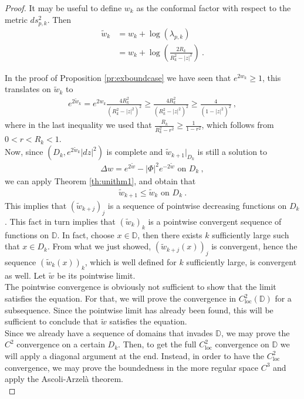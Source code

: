 \documentclass[a4paper,11pt,openright,twoside]{book}
\newcommand{\1}{\mathds{1}}
\newcommand{\loc}{\mathrm{loc}}
\theoremstyle{plain}
\theoremstyle{definition}
\theoremstyle{remark}
\begin{document}
\begin{proof}
	It may be useful to define $w_k$ as the conformal factor with respect to the metric $ds_{p,k}^2$. Then
	\begin{align*}
		\tilde  w_k &= w_k +\log \left( \lambda_{p,k} \right) \\
		&=  w_k +\log\left( \frac{2R_k}{R_k^2-|z|^2} \right) 
	\ . 
	\end{align*}
	
	In the proof of Proposition \ref{pr:exboundcase} we have seen that $e^{2w_k}\geq 1$, this translates on $\tilde w_k$ to 
	\begin{align}\label{eq:exthm2}
		e^{2\tilde w_k} = e^{2w_k}\frac{4R_k^2}{(R_k^2-|z|^2)^2}
		\geq \frac{4R_k^2}{(R_k^2-|z|^2)^2} \geq \frac{4}{(1-|z|^2)^2}
	\ , 
	\end{align}
	where in the last inequality we used that $\frac{R_k}{R_k^2-r^2}\geq \frac{1}{1-r^2}$, which follows from $0<r<R_k<1$.\\

	Now, since $(D_k,e^{2\tilde w_k}|dz|^2)$ is complete and $\tilde w_{k+1}|_{D_k}$ is still a solution to 
	\begin{align*}
		\Delta w = e^{2\tilde w}-|\Phi|^2 e^{-2\tilde w}\text{ on } D_k
	\ , 
	\end{align*}
	we can apply Theorem \ref{th:unithm1}, and obtain that
	\begin{align}\label{eq:exthm3}
		 \tilde w_{k+1} \leq \tilde w_k \text{ on } D_k
	\ . 
	\end{align}
	This implies that $(\tilde w_{k+j})_{j}$ is a sequence of pointwise decreasing functions on $D_k$. This fact in turn implies that $(\tilde w_k)_k$ is a pointwise convergent sequence of functions on $\mathbb{D}$. In fact, choose $x\in \mathbb{D}$, then there exists $k$ sufficiently large such that $x\in D_k$. From what we just showed, $(\tilde w_{k+j}(x))_j$ is convergent, hence the sequence $(\tilde w_k(x))_k$, which is well defined for $k$ sufficiently large, is convergent as well. Let $\tilde w$ be its pointwise limit.\\

	The pointwise convergence is obviously not sufficient to show that the limit satisfies the equation. For that, we will prove the convergence in $C^2_{\loc}(\mathbb{D})$ for a subsequence. Since the pointwise limit has already been found, this will be sufficient to conclude that $\tilde w$ satisfies the equation.\\

	Since we already have a sequence of domains that invades $\mathbb{D}$, we may prove the $C^2$ convergence on a certain $D_k$. Then, to get the full $C^2_{\loc}$ convergence on $\mathbb{D}$ we will apply a diagonal argument at the end. Instead, in order to have the $C^2_\loc$ convergence, we may prove the boundedness in the more regular space $C^3$ and apply the Ascoli-Arzelà theorem.\\
	

\end{proof}
\end{document}
